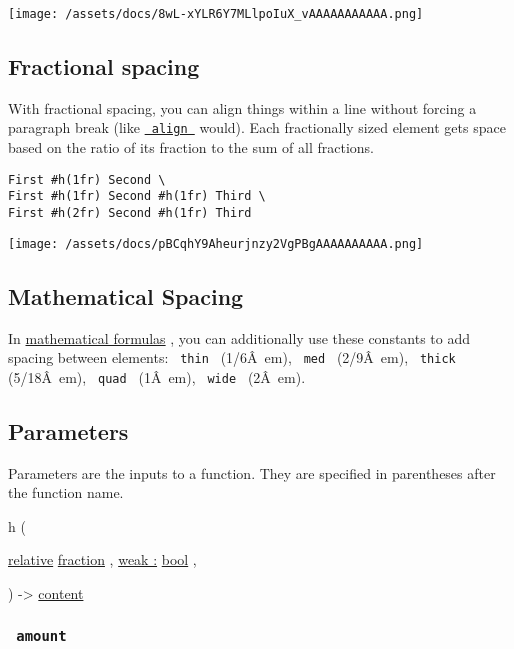 \texttt{[image: /assets/docs/8wL-xYLR6Y7MLlpoIuX\_vAAAAAAAAAAA.png]}

\subsection{Fractional spacing}\label{fractional-spacing}

With fractional spacing, you can align things within a line without
forcing a paragraph break (like
\href{/docs/reference/layout/align/}{\texttt{\ align\ }} would). Each
fractionally sized element gets space based on the ratio of its fraction
to the sum of all fractions.

\begin{verbatim}
First #h(1fr) Second \
First #h(1fr) Second #h(1fr) Third \
First #h(2fr) Second #h(1fr) Third
\end{verbatim}

\texttt{[image: /assets/docs/pBCqhY9Aheurjnzy2VgPBgAAAAAAAAAA.png]}

\subsection{Mathematical Spacing}\label{math-spacing}

In \href{/docs/reference/math/}{mathematical formulas} , you can
additionally use these constants to add spacing between elements:
\texttt{\ thin\ } (1/6Â~em), \texttt{\ med\ } (2/9Â~em),
\texttt{\ thick\ } (5/18Â~em), \texttt{\ quad\ } (1Â~em),
\texttt{\ wide\ } (2Â~em).

\subsection{\texorpdfstring{{ Parameters
}}{ Parameters }}\label{parameters}

\label{parameters-tooltip}
Parameters are the inputs to a function. They are specified in
parentheses after the function name.

{ h } (

{ \href{/docs/reference/layout/relative/}{relative}
\href{/docs/reference/layout/fraction/}{fraction} , } {
\hyperref[parameters-weak]{weak :}
\href{/docs/reference/foundations/bool/}{bool} , }

) -\textgreater{} \href{/docs/reference/foundations/content/}{content}

\subsubsection{\texorpdfstring{\texttt{\ amount\ }}{ amount }}\label{parameters-amount}

